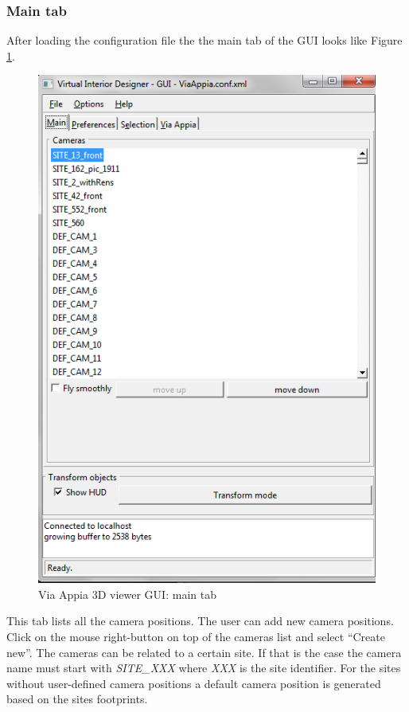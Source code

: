 \documentclass[a4paper,11pt]{article}
\begin{document}
\subsubsection{Main tab}

After loading the configuration file the the main tab of the GUI looks like Figure \ref{fig-guimain}. 

\begin{figure}[!ht]
\centering
\includegraphics[scale=0.5]{fig/main}
\caption{Via Appia 3D viewer GUI: main tab}
\label{fig-guimain}
\end{figure}

This tab lists all the camera positions. The user can add new camera positions. Click on the mouse right-button on top of the cameras list and select ``Create new''. The cameras can be related to a certain site. If that is the case the camera name must start with \textit{SITE\_XXX} where \textit{XXX} is the site identifier. For the sites without user-defined camera positions a default camera position is generated based on the sites footprints.
\end{document}
